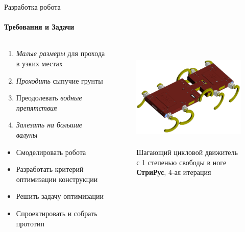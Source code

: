 \documentclass[aspectratio=169,xcolor=table,10pt]{beamer}
\begin{document}
\begin{frame}[t]{Разработка робота}
    \framesubtitle{Требования и Задачи}
    \vspace{-0.5cm}
    \begin{columns}[T,onlytextwidth]
        \begin{column}{0.49\textwidth}
            \vspace{-0.2cm}
            \begin{enumerate}
                \item \textit{Малые размеры} для прохода в узких местах
                \item \textit{Проходить} сыпучие грунты
                \item Преодолевать \textit{водные препятствия}
                \item \textit{Залезать на большие валуны}
            \end{enumerate}
            \begin{itemize}
                \item Смоделировать робота
                \item Разработать критерий оптимизации конструкции
                \item Решить задачу оптимизации
                \item Спроектировать и собрать прототип
            \end{itemize}
        \end{column}
        \begin{column}{0.49\textwidth}
            \vspace{-1.1cm}
            \begin{figure}[H]
                \centering\includegraphics[height=5cm,width=1\textwidth,keepaspectratio]{strirus_4.png}
                \caption*{Шагающий цикловой движитель с 1 степенью свободы в ноге \\ \textbf{СтриРус}, 4-ая итерация}
                \label{fig:strirus_4.png}
            \end{figure}
        \end{column}
    \end{columns}
\end{frame}
\end{document}
